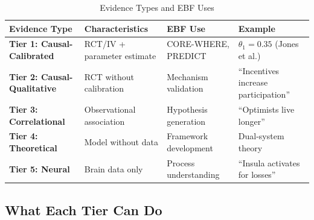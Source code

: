 \documentclass[11pt, a4paper]{article}
\begin{document}
\begin{table}[htbp]
\centering
\caption{Evidence Types and EBF Uses}
\label{tab:evd-hierarchy}
\renewcommand{\arraystretch}{1.4}
\begin{tabular}{@{}p{2.5cm}p{3.5cm}p{3cm}p{3cm}@{}}
\toprule
\textbf{Evidence Type} & \textbf{Characteristics} & \textbf{EBF Use} & \textbf{Example} \\
\midrule
\textbf{Tier 1: Causal-Calibrated} & RCT/IV + parameter estimate & CORE-WHERE, PREDICT & $\theta_1 = 0.35$ (Jones et al.) \\
\textbf{Tier 2: Causal-Qualitative} & RCT without calibration & Mechanism validation & ``Incentives increase participation'' \\
\textbf{Tier 3: Correlational} & Observational association & Hypothesis generation & ``Optimists live longer'' \\
\textbf{Tier 4: Theoretical} & Model without data & Framework development & Dual-system theory \\
\textbf{Tier 5: Neural} & Brain data only & Process understanding & ``Insula activates for losses'' \\
\bottomrule
\end{tabular}
\end{table}

\subsection{What Each Tier Can Do}
\end{document}
